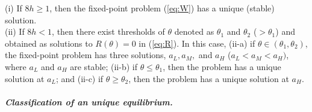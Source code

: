 \begin{lemma}
\label{lem:multiple sol}(i) If $8h\ge1$, then the fixed-point problem (\ref{eq:W}) has a unique (stable) solution.\\
(ii) If $8h<1$, then there exist thresholds of $\theta$ denoted as $\theta_{1}$ and $\theta_{2}$ ($>\theta_{1}$) and obtained as solutions to $R(\theta)=0$ in (\ref{eq:R}). In this case, (ii-a) if $\theta\in(\theta_{1},\theta_{2})$, the fixed-point problem has three solutions, $a_{L},a_{M},$ and $a_{H}$ ($a_{L}<a_{M}<a_{H})$, where $a_{L}$ and $a_{H}$ are stable; (ii-b) if $\theta\le\theta_{1}$, then the problem has a unique solution at $a_{L}$; and (ii-c) if $\theta\ge\theta_{2}$, then the problem has a unique solution at $a_{H}$.
\end{lemma}

\paragraph*{\textmd{\textit{Classification of an unique equilibrium.}}}

